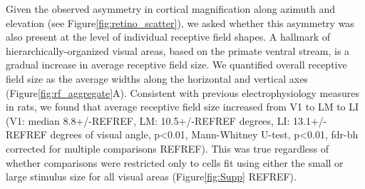 Given the observed asymmetry in cortical magnification along azimuth and elevation (see Figure\ref{fig:retino_scatter}), we asked whether this asymmetry was also present at the level of individual receptive field shapes. A hallmark of hierarchically-organized visual areas, based on the primate ventral stream, is a gradual increase in average receptive field size\cite{RustREFREF, Vermaerke2014, Siegle2019AAreas, Tafazoli2017}. We quantified overall receptive field size as the average widths along the horizontal and vertical axes (Figure\ref{fig:rf_aggregate}A). Consistent with previous electrophysiology measures in rats\cite{Vermaercke2014, Tafazoli2017}, we found that average receptive field size increased from V1 to LM to LI (V1: median 8.8+/-REFREF, LM: 10.5+/-REFREF degrees, LI: 13.1+/-REFREF degrees of visual angle, p<0.01, Mann-Whitney U-test, p<0.01, fdr-bh corrected for multiple comparisons REFREF). This was true regardless of whether comparisons were restricted only to cells fit using either the small or large stimulus size for all visual areas (Figure\ref{fig:Supp} REFREF).  


